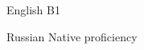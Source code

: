 
\begin{cvskills}

  \cvskill
    {English} %
    {B1} %

  \cvskill
    {Russian} %
    {Native proficiency} %

\end{cvskills}
